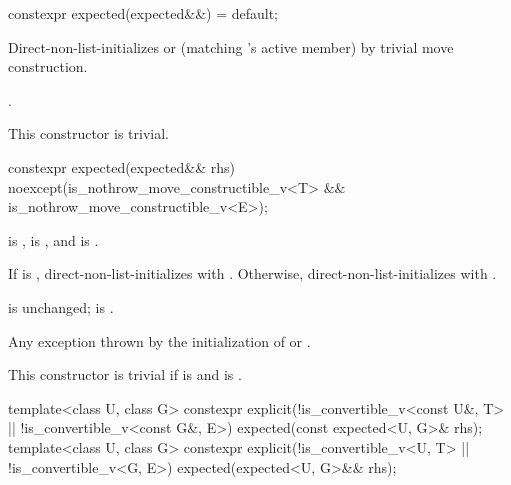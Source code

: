 %
\begin{itemdecl}
constexpr expected(expected&&) = default;
\end{itemdecl}

\begin{itemdescr}
\pnum
\effects
Direct-non-list-initializes  or  (matching 's active member) by trivial move construction.

\pnum
\ensures
{}.

\pnum
\remarks
This constructor is trivial.
\end{itemdescr}

%
\begin{itemdecl}
constexpr expected(expected&& rhs) noexcept(is_nothrow_move_constructible_v<T> &&
                                            is_nothrow_move_constructible_v<E>);
\end{itemdecl}

\begin{itemdescr}
\pnum
\constraints
{} is ,  is , and  is .

\pnum
\effects
If  is , direct-non-list-initializes  with . Otherwise, direct-non-list-initializes  with .

\pnum
\ensures
{} is unchanged;  is .

\pnum
\throws
Any exception thrown by the initialization of  or .

\pnum
\remarks
This constructor is trivial if  is  and  is .
\end{itemdescr}

%
\begin{itemdecl}
template<class U, class G>
constexpr explicit(!is_convertible_v<const U&, T> || !is_convertible_v<const G&, E>)
    expected(const expected<U, G>& rhs);
template<class U, class G>
constexpr explicit(!is_convertible_v<U, T> || !is_convertible_v<G, E>)
    expected(expected<U, G>&& rhs);
\end{itemdecl}

